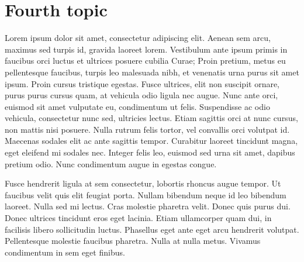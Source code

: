 \section{Fourth topic} 
Lorem ipsum dolor sit amet, consectetur adipiscing elit. Aenean sem arcu, maximus sed turpis id, gravida laoreet lorem. Vestibulum ante ipsum primis in faucibus orci luctus et ultrices posuere cubilia Curae; Proin pretium, metus eu pellentesque faucibus, turpis leo malesuada nibh, et venenatis urna purus sit amet ipsum. Proin cursus tristique egestas. Fusce ultrices, elit non suscipit ornare, purus purus cursus quam, at vehicula odio ligula nec augue. Nunc ante orci, euismod sit amet vulputate eu, condimentum ut felis. Suspendisse ac odio vehicula, consectetur nunc sed, ultricies lectus. Etiam sagittis orci at nunc cursus, non mattis nisi posuere. Nulla rutrum felis tortor, vel convallis orci volutpat id. Maecenas sodales elit ac ante sagittis tempor. Curabitur laoreet tincidunt magna, eget eleifend mi sodales nec. Integer felis leo, euismod sed urna sit amet, dapibus pretium odio. Nunc condimentum augue in egestas congue.

Fusce hendrerit ligula at sem consectetur, lobortis rhoncus augue tempor. Ut faucibus velit quis elit feugiat porta. Nullam bibendum neque id leo bibendum laoreet. Nulla sed mi lectus. Cras molestie pharetra velit. Donec quis purus dui. Donec ultrices tincidunt eros eget lacinia. Etiam ullamcorper quam dui, in facilisis libero sollicitudin luctus. Phasellus eget ante eget arcu hendrerit volutpat. Pellentesque molestie faucibus pharetra. Nulla at nulla metus. Vivamus condimentum in sem eget finibus.

